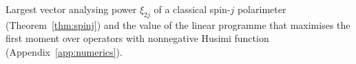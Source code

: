 \begin{table}[t]
\caption{Largest vector analysing power $\xi_{2j}$ of a classical spin-$j$ polarimeter (Theorem~\ref{thm:spinj}) and the value of the linear programme that maximises the first moment over operators with nonnegative Husimi function (Appendix~\ref{app:numerics}).}
\label{tab:gj}

\end{table}
